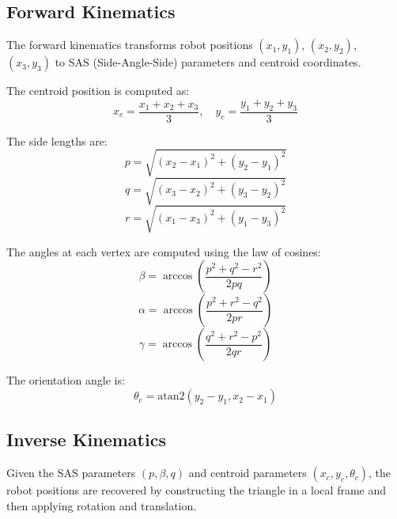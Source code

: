 \documentclass[lettersize,journal]{IEEEtran}
\begin{document}
\subsection{Forward Kinematics}

The forward kinematics transforms robot positions $(x_1, y_1)$, $(x_2, y_2)$, $(x_3, y_3)$ to SAS (Side-Angle-Side) parameters and centroid coordinates.

The centroid position is computed as:
\begin{equation}
x_c = \frac{x_1 + x_2 + x_3}{3}, \quad y_c = \frac{y_1 + y_2 + y_3}{3}
\end{equation}

The side lengths are:
\begin{equation}
p = \sqrt{(x_2 - x_1)^2 + (y_2 - y_1)^2}
\end{equation}
\begin{equation}
q = \sqrt{(x_3 - x_2)^2 + (y_3 - y_2)^2}
\end{equation}
\begin{equation}
r = \sqrt{(x_1 - x_3)^2 + (y_1 - y_3)^2}
\end{equation}

The angles at each vertex are computed using the law of cosines:
\begin{equation}
\beta = \arccos\left(\frac{p^2 + q^2 - r^2}{2pq}\right)
\end{equation}
\begin{equation}
\alpha = \arccos\left(\frac{p^2 + r^2 - q^2}{2pr}\right)
\end{equation}
\begin{equation}
\gamma = \arccos\left(\frac{q^2 + r^2 - p^2}{2qr}\right)
\end{equation}

The orientation angle is:
\begin{equation}
\theta_c = \text{atan2}(y_2 - y_1, x_2 - x_1)
\end{equation}

\subsection{Inverse Kinematics}

Given the SAS parameters $(p, \beta, q)$ and centroid parameters $(x_c, y_c, \theta_c)$, the robot positions are recovered by constructing the triangle in a local frame and then applying rotation and translation.
\end{document}
